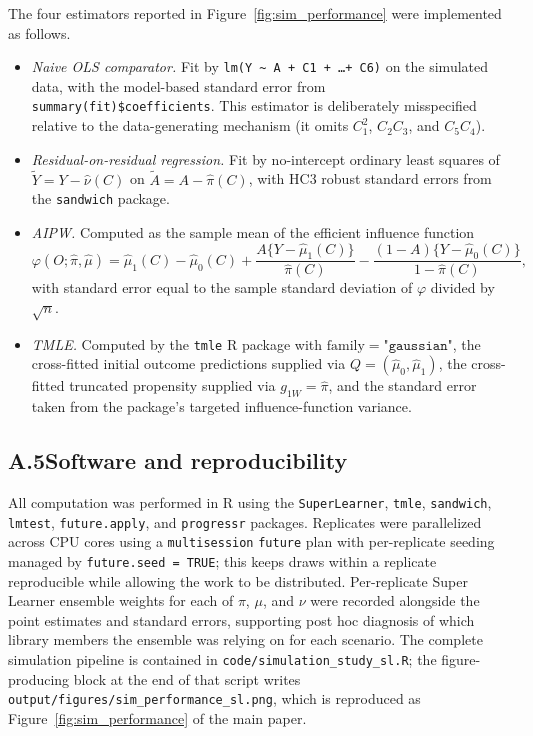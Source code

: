 \documentclass[12pt]{article}
\begin{document}
The four estimators reported in Figure~\ref{fig:sim_performance} were implemented as follows.
\begin{itemize}
\item \emph{Naive OLS comparator.} Fit by \texttt{lm(Y \textasciitilde~A + C1 + \ldots + C6)} on the simulated data, with the model-based standard error from \texttt{summary(fit)\$coefficients}. This estimator is deliberately misspecified relative to the data-generating mechanism (it omits $C_1^2$, $C_2 C_3$, and $C_5 C_4$).
\item \emph{Residual-on-residual regression.} Fit by no-intercept ordinary least squares of $\tilde Y = Y - \hat\nu(C)$ on $\tilde A = A - \hat\pi(C)$, with HC3 robust standard errors from the \texttt{sandwich} package.
\item \emph{AIPW.} Computed as the sample mean of the efficient influence function
$$\varphi(O; \hat\pi, \hat\mu) = \hat\mu_1(C) - \hat\mu_0(C) + \frac{A \{Y - \hat\mu_1(C)\}}{\hat\pi(C)} - \frac{(1 - A)\{Y - \hat\mu_0(C)\}}{1 - \hat\pi(C)},$$
with standard error equal to the sample standard deviation of $\varphi$ divided by $\sqrt{n}$.
\item \emph{TMLE.} Computed by the \texttt{tmle} R package with $\mathrm{family} = \texttt{"gaussian"}$, the cross-fitted initial outcome predictions supplied via $Q = (\hat\mu_0, \hat\mu_1)$, the cross-fitted truncated propensity supplied via $g_{1W} = \hat\pi$, and the standard error taken from the package's targeted influence-function variance.
\end{itemize}

\subsection*{A.5\quad Software and reproducibility}

All computation was performed in R using the \texttt{SuperLearner}, \texttt{tmle}, \texttt{sandwich}, \texttt{lmtest}, \texttt{future.apply}, and \texttt{progressr} packages. Replicates were parallelized across CPU cores using a \texttt{multisession} \texttt{future} plan with per-replicate seeding managed by \texttt{future.seed = TRUE}; this keeps draws within a replicate reproducible while allowing the work to be distributed. Per-replicate Super Learner ensemble weights for each of $\pi$, $\mu$, and $\nu$ were recorded alongside the point estimates and standard errors, supporting post hoc diagnosis of which library members the ensemble was relying on for each scenario. The complete simulation pipeline is contained in \texttt{code/simulation\_study\_sl.R}; the figure-producing block at the end of that script writes \texttt{output/figures/sim\_performance\_sl.png}, which is reproduced as Figure~\ref{fig:sim_performance} of the main paper.
\end{document}
